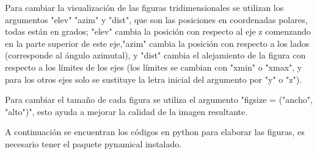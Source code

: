 Para cambiar la visualización de las figuras tridimensionales se utilizan los argumentos "\textsf{elev}" "\textsf{azim}" y "\textsf{dist}", que son las posiciones en coordenadas polares, todas están en grados; "elev" cambia la posición con respecto al eje z comenzando en la parte superior de este eje,"azim" cambia la posición con respecto a los lados (corresponde al ángulo azimutal), y "dist" cambia el alejamiento de la figura con respecto a los límites de los ejes (los límites se cambian con "\textsf{xmin}" o "\textsf{xmax}", y para los otros ejes solo se sustituye la letra inicial del argumento por "y" o "z").

Para cambiar el tamaño de cada figura se utiliza el argumento "\textsf{figsize = ("ancho", "alto")}", esto ayuda a mejorar la calidad de la imagen resultante.

A continuación se encuentran los códigos en python para elaborar las figuras, es necesario tener el paquete \textsf{pynamical} instalado.

